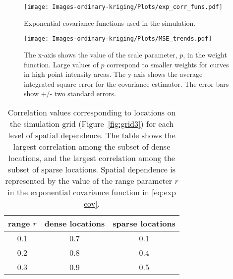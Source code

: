 \begin{figure}[h]
	\begin{center}
		\texttt{[image: Images-ordinary-kriging/Plots/exp\_corr\_funs.pdf]} 
	\end{center}
	\caption{Exponential covariance functions used in the simulation.} \label{fig:exp_corr_funs} 
\end{figure}

\begin{figure}[h]
	\begin{center}
		\texttt{[image: Images-ordinary-kriging/Plots/MSE\_trends.pdf]} 
	\end{center}
	\caption{The x-axis shows the value of the scale parameter, $p$, in the weight function. Large values of $p$ correspond to smaller weights for curves in high point intensity areas. The y-axis shows the average integrated square error for the covariance estimator. The error bars show +/- two standard errors.} \label{fig:MSE_trends} 
\end{figure}


\begin{table}
	\begin{center}
	\caption{Correlation values corresponding to locations on the simulation grid (Figure~\ref{fig:grid3}) for each level of spatial dependence. The table shows the largest correlation among the subset of dense locations, and the largest correlation among the subset of sparse locations. Spatial dependence is represented by the value of the range parameter $r$ in the exponential covariance function in \eqref{eq:exp cov}.}
\begin{tabular}{|c|c|c|}
	\hline
	range $r$ & dense locations & sparse locations \\
	\hline
	0.1 & 0.7 & 0.1 \\
	0.2 & 0.8 & 0.4 \\
	0.3 & 0.9 & 0.5 \\
	\hline
\end{tabular}
\label{tab:corr values}
\end{center}
\end{table}


